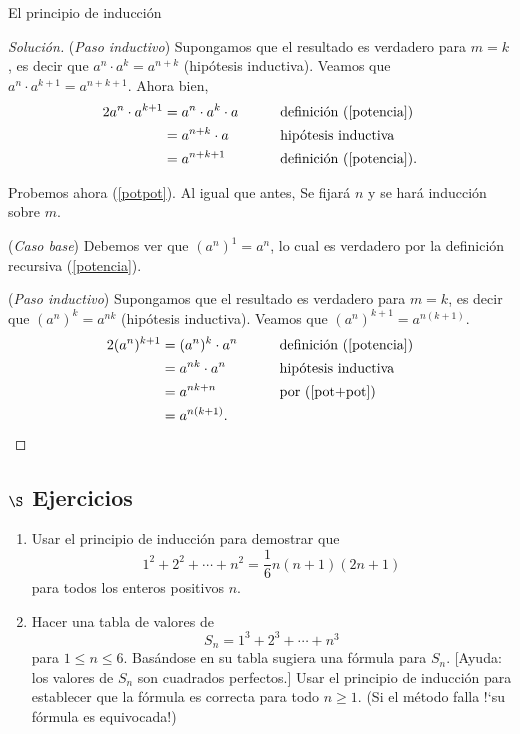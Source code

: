 \begin{section}{El principio de inducción}
\begin{proof}[Solución]
    \noindent (\textit{Paso  inductivo}) Supongamos que el resultado es verdadero para $m=k$, es decir que $a^{n} \cdot a^k = a^{n+k}$ (hipótesis inductiva). Veamos que  $a^{n} \cdot a^{k+1} = a^{n+k+1}$. Ahora bien, 
    \begin{alignat*}2
        a^{n} \cdot a^{k+1} &= a^{n} \cdot a^{k} \cdot a &\qquad  &\text{definición (\ref{potencia})} \\
        &= a^{n+k} \cdot a &\qquad &\text{hipótesis inductiva} \\
        &= a^{n+k+1} &\qquad  &\text{definición (\ref{potencia})}. 
    \end{alignat*}
    
    Probemos ahora (\ref{potpot}). Al igual que antes, Se fijará $n$ y se hará inducción sobre $m$.
    
    \noindent(\textit{Caso  base}) Debemos ver que $(a^n)^1 = a^n$, lo cual es verdadero por la definición recursiva (\ref{potencia}). 
    
    
    \noindent (\textit{Paso  inductivo}) Supongamos que el resultado es verdadero para $m=k$, es decir que  $(a^n)^k = a^{nk}$ (hipótesis inductiva). Veamos que  $(a^n)^{k+1} = a^{n(k+1)}$. 
    \begin{alignat*}2
        (a^n)^{k+1} &= (a^n)^{k} \cdot a^n &\qquad  &\text{definición (\ref{potencia})} \\
        &= a^{nk} \cdot a^n &\qquad &\text{hipótesis inductiva} \\
        &= a^{nk+n} &\qquad  &\text{por (\ref{pot+pot}})\\
        &= a^{n(k+1)}. &\qquad  &
    \end{alignat*}
\end{proof}

\subsection*{$\S$ Ejercicios}
\begin{enumerate}
\item Usar el principio de inducción para demostrar que
$$
1^2+2^2+\cdots +n^2 = \frac16 n(n+1)(2n +1)
$$
para todos los enteros positivos $n$.

\item Hacer una tabla de valores de
$$
S_n = 1^3+2^3+\cdots +n^3
$$
para $1 \le n\le 6$. Basándose en su tabla sugiera una fórmula para $S_n$. [Ayuda: los valores de $S_n$ son cuadrados perfectos.] Usar el principio de inducción para establecer que la fórmula es correcta para todo $n\ge 1$. (Si el método falla !`su fórmula es equivocada!)


\end{enumerate}
\end{section}
